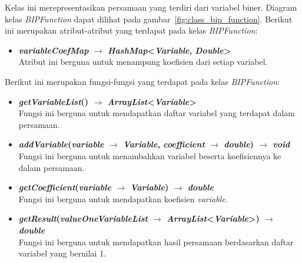 Kelas ini merepresentasikan persamaan yang terdiri dari variabel biner. Diagram kelas \textit{BIPFunction} dapat dilihat pada gambar~\ref{fig:class_bip_function}. Berikut ini merupakan atribut-atribut yang terdapat pada kelas \textit{BIPFunction}:
\begin{itemize}
	\item \textbf{\textit{variableCoefMap} $\rightarrow$ \textit{HashMap}<\textit{Variable}, \textit{Double}>}\\
	Atribut ini berguna untuk menampung koefisien dari setiap variabel.
\end{itemize}
Berikut ini merupakan fungsi-fungsi yang terdapat pada kelas \textit{BIPFunction}:
\begin{itemize}
	\item \textbf{\textit{getVariableList}() $\rightarrow$ \textit{ArrayList}<\textit{Variable}>}\\
	Fungsi ini berguna untuk mendapatkan daftar variabel yang terdapat dalam persamaan.
	\item \textbf{\textit{addVariable}(\textit{variable} $\rightarrow$ \textit{Variable}, \textit{coefficient} $\rightarrow$ \textit{double}) $\rightarrow$ \textit{void}}\\
	Fungsi ini berguna untuk menambahkan variabel beserta koefisiennya ke dalam persamaan.
	\item \textbf{\textit{getCoefficient}(\textit{variable} $\rightarrow$ \textit{Variable}) $\rightarrow$ \textit{double}}\\
	Fungsi ini berguna untuk mendapatkan koefisien \textit{variable}.
	\item \textbf{\textit{getResult}(\textit{valueOneVariableList} $\rightarrow$ \textit{ArrayList}<\textit{Variable}>) $\rightarrow$ \textit{double}}\\
	Fungsi ini berguna untuk mendapatkan hasil persamaan berdasarkan daftar variabel yang bernilai 1.
\end{itemize}

